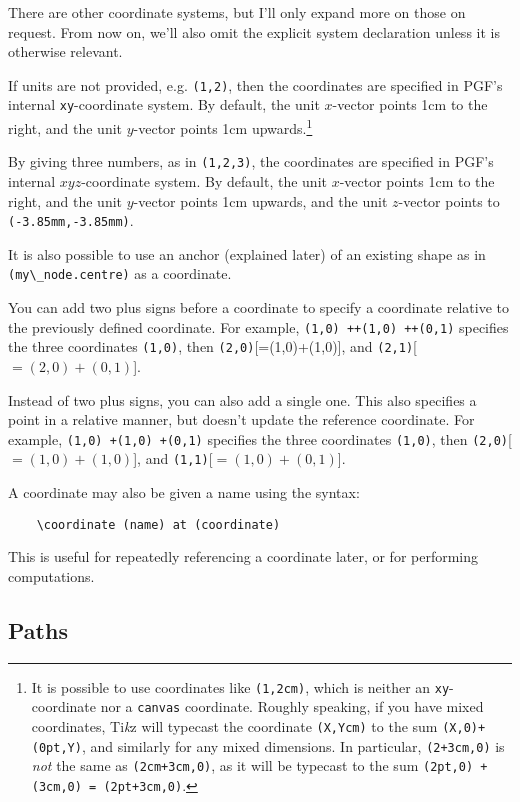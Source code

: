 \documentclass{article}
\theoremstyle{definition}
\theoremstyle{definition}
\theoremstyle{remark}
\newcommand{\Tikz}{Ti\textit{k}z{}}
\begin{document}
There are other coordinate systems, but I'll only expand more on those on request. From now on, we'll also omit the explicit system declaration unless it is otherwise relevant.

If units are not provided, e.g. \verb|(1,2)|, then the coordinates are specified in PGF's internal \verb|xy|-coordinate system. By default, the unit $x$-vector points 1cm to the right, and the unit $y$-vector points 1cm upwards.\footnote{It is possible to use coordinates like \verb|(1,2cm)|, which is neither an \verb|xy|-coordinate nor a \verb|canvas| coordinate. Roughly speaking, if you have mixed coordinates, \Tikz{} will typecast the coordinate \verb|(X,Ycm)| to the sum \verb|(X,0)+(0pt,Y)|, and similarly for any mixed dimensions. In particular, \verb|(2+3cm,0)| is \textit{not} the same as \verb|(2cm+3cm,0)|, as it will be typecast to the sum \verb|(2pt,0) + (3cm,0) = (2pt+3cm,0)|.}

By giving three numbers, as in \verb|(1,2,3)|, the coordinates are specified in PGF's internal $xyz$-coordinate system. By default, the unit $x$-vector points 1cm to the right, and the unit $y$-vector points 1cm upwards, and the unit $z$-vector points to \verb|(-3.85mm,-3.85mm)|.

It is also possible to use an anchor (explained later) of an existing shape as in \verb|(my\_node.centre)| as a coordinate.

You can add two plus signs before a coordinate to specify a coordinate relative to the previously defined coordinate. For example, \verb|(1,0) ++(1,0) ++(0,1)| specifies the three coordinates \verb|(1,0)|, then \verb|(2,0)|[=(1,0)+(1,0)], and \verb|(2,1)|[$=(2,0)+(0,1)$].

Instead of two plus signs, you can also add a single one. This also specifies a point in a relative manner, but doesn't update the reference coordinate. For example, \verb|(1,0) +(1,0) +(0,1)| specifies the three coordinates \verb|(1,0)|, then \verb|(2,0)|[$=(1,0)+(1,0)$], and \verb|(1,1)|[$=(1,0)+(0,1)$].

A coordinate may also be given a name using the syntax:
\begin{verbatim}
    \coordinate (name) at (coordinate)
\end{verbatim}
This is useful for repeatedly referencing a coordinate later, or for performing computations.


\subsection*{Paths}
\end{document}
